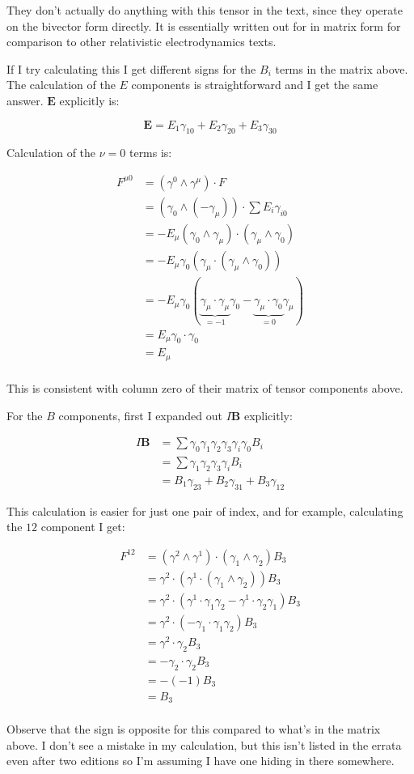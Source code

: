 \documentclass{article}      %
\begin{document}
They don't actually do anything with this tensor in the text, since they operate on the bivector form directly.  It is essentially written out for in matrix form for comparison to other relativistic electrodynamics texts.

If I try calculating this I get different signs for the $B_i$ terms in the matrix above.  The 
calculation of the $E$ components is straightforward and I get the same answer.  $\mathbf{E}$ explicitly is:

\[
\mathbf{E} = E_1 \gamma_{10} + E_2 \gamma_{20} + E_3 \gamma_{30}
\]

Calculation of the $\nu = 0$ terms is:

\begin{align*}
F^{\mu 0} 
&= (\gamma^0 \wedge \gamma^\mu) \cdot F \\
&= (\gamma_0 \wedge (-\gamma_\mu)) \cdot \sum E_i \gamma_{i0} \\
&= -E_\mu (\gamma_0 \wedge \gamma_\mu) \cdot (\gamma_\mu \wedge \gamma_{0}) \\
&= -E_\mu \gamma_0 (\gamma_\mu \cdot (\gamma_\mu \wedge \gamma_{0})) \\
&= -E_\mu \gamma_0 ( \underbrace{\gamma_\mu \cdot \gamma_\mu}_{=-1} \gamma_{0} - \underbrace{\gamma_\mu \cdot \gamma_{0}}_{=0} \gamma_\mu) \\
&= E_\mu \gamma_0 \cdot \gamma_0 \\
&= E_\mu \\
\end{align*}

This is consistent with column zero of their matrix of tensor components above.

For the $B$ components, first I expanded out $I\mathbf{B}$ explicitly:

\begin{align*}
I\mathbf{B} 
&= \sum \gamma_0 \gamma_1 \gamma_2 \gamma_3 \gamma_i \gamma_0 B_i \\
&= \sum \gamma_1 \gamma_2 \gamma_3 \gamma_i B_i \\
&= B_1 \gamma_{23} + B_2 \gamma_{31} + B_3 \gamma_{12}
\end{align*}

This calculation is easier for just one pair of index, and for example, calculating the $12$ component I get:

\begin{align*}
F^{12} 
&= (\gamma^2 \wedge \gamma^1) \cdot ( \gamma_1 \wedge \gamma_2 ) B_3 \\
&= \gamma^2 \cdot (\gamma^1 \cdot ( \gamma_1 \wedge \gamma_2 )) B_3 \\
&= \gamma^2 \cdot ( \gamma^1 \cdot \gamma_1 \gamma_2 - \gamma^1 \cdot \gamma_2 \gamma_1 ) B_3 \\
&= \gamma^2 \cdot ( -\gamma_1 \cdot \gamma_1 \gamma_2 ) B_3 \\
&= \gamma^2 \cdot \gamma_2 B_3 \\
&= - \gamma_2 \cdot \gamma_2 B_3 \\
&= - (-1) B_3 \\
&= B_3 \\
\end{align*}

Observe that the sign is opposite for this compared to what's in the matrix above.  I don't see a mistake in my calculation, but this isn't listed in the errata even after two editions
so I'm assuming I have one hiding in there somewhere.
\end{document}

